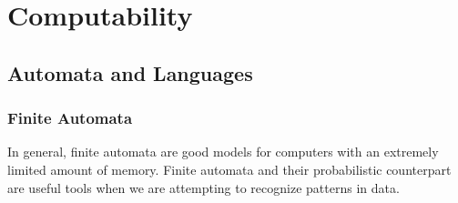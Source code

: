 \documentclass[12pt, a4paper, oneside, openright, titlepage]{book}
\begin{document}
\part{Computability}

\chapter{Automata and Languages}


\section{Finite Automata}

In general, finite automata are good models for computers with an extremely limited amount of memory. Finite automata and their probabilistic counterpart  are useful tools when we are attempting to recognize patterns in data. 
\end{document}
